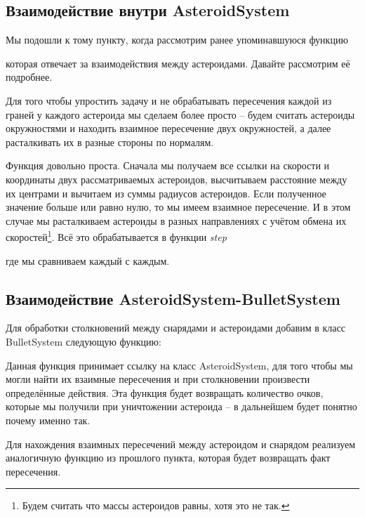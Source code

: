 \subsection{Взаимодействие внутри AsteroidSystem}
Мы подошли к тому пункту, когда рассмотрим ранее упоминавшуюся функцию

которая отвечает за взаимодействия между астероидами. Давайте рассмотрим её подробнее.

Для того чтобы упростить задачу и не обрабатывать пересечения каждой из граней у каждого астероида мы 
сделаем более просто -- будем считать астероиды окружностями и находить взаимное пересечение двух 
окружностей, а далее расталкивать их в разные стороны по нормалям.


Функция довольно проста. Сначала мы получаем все ссылки на скорости и координаты двух рассматриваемых 
астероидов, высчитываем расстояние между их центрами и вычитаем из суммы радиусов астероидов. Если 
полученное значение больше или равно нулю, то мы имеем взаимное пересечение. И в этом случае мы расталкиваем 
астероиды в разных направлениях с учётом обмена их скоростей\footnote{Будем считать что массы астероидов 
равны, хотя это не так.}. Всё это обрабатывается в функции \emph{step}

где мы сравниваем каждый с каждым.

\newpage

\subsection{Взаимодействие AsteroidSystem-BulletSystem}
\label{ast:collide}
Для обработки столкновений между снарядами и астероидами добавим в класс BulletSystem следующую функцию:


Данная функция принимает ссылку на класс AsteroidSystem, для того чтобы мы могли найти их взаимные 
пересечения и при столкновении произвести определённые действия. Эта функция будет возвращать количество 
очков, которые мы получили при уничтожении астероида -- в дальнейшем будет понятно почему именно так.

Для нахождения взаимных пересечений между астероидом и снарядом реализуем аналогичную функцию из прошлого 
пункта, которая будет возвращать факт пересечения.


